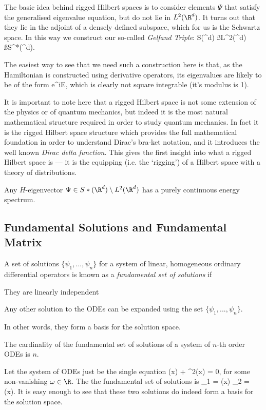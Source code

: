 The basic idea behind rigged Hilbert spaces is to consider elements $\Psi$ that satisfy the generalised eigenvalue equation, but do not lie in $L^2(\R^d)$. It turns out that they lie in the adjoint of a densely defined subspace, which for us is the Schwartz space. In this way we construct our so-called \emph{Gelfand Triple}:
\bse 
S(\R^d) \ss L^2(\R^d) \ss S^*(\R^d).
\ese 

The easiest way to see that we need such a construction here is that, as the Hamiltonian is constructed using derivative operators, its eigenvalues are likely to be of the form 
\bse 
\Psi \propto e^{iE},
\ese
which is clearly not square integrable (it's modulus is 1).

\br 
It is important to note here that a rigged Hilbert space is not some extension of the physics or of quantum mechanics, but indeed it is the most natural mathematical structure required in order to study quantum mechanics. In fact it is the rigged Hilbert space structure which provides the full mathematical foundation in order to understand Dirac's bra-ket notation, and it introduces the well known \emph{Dirac delta function}. This gives the first insight into what a rigged Hilbert space is --- it is the equipping (i.e. the `rigging') of a Hilbert space with a theory of distributions. 
\er 

\bp
Any $H$-eigenvector $\Psi\in S*(\R^d)\setminus L^2(\R^d)$ has a purely continuous energy spectrum.
\ep 

\subsection{Fundamental Solutions and Fundamental Matrix}

\bd 
A set of solutions $\{\psi_1,...,\psi_n\}$ for a system of linear, homogeneous ordinary differential operators is known as a \emph{fundamental set of solutions} if 
\ben[label=(\roman*)]
\item They are linearly independent 
\item Any other solution to the ODEs can be expanded using the set $\{\psi_1,...,\psi_n\}$.
\een 

In other words, they form a basis for the solution space. 
\ed 

\bp 
The cardinality of the fundamental set of solutions of a system of $n$-th order ODEs is $n$.
\ep 

\be 
Let the system of ODEs just be the single equation 
\bse 
\ddot{\psi}(x) + \omega^2\psi(x) = 0,
\ese 
for some non-vanishing $\omega\in\R$. The the fundamental set of solutions is 
\bse 
\psi_1 = \cos(\omega x) \qquad {} \qquad \psi_2 = \sin(\omega x).
\ese 
It is easy enough to see that these two solutions do indeed form a basis for the solution space.
\ee 

